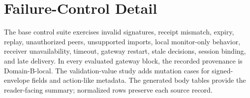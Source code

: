 \section{Failure-Control Detail}

The base control suite exercises invalid signatures, receipt mismatch, expiry, replay, unauthorized peers, unsupported imports, local monitor-only behavior, receiver unavailability, timeout, gateway restart, stale decisions, session binding, and late delivery. In every evaluated gateway block, the recorded provenance is Domain-B-local. The validation-value study adds mutation cases for signed-envelope fields and action-like metadata. The generated body tables provide the reader-facing summary; normalized rows preserve each source record.
